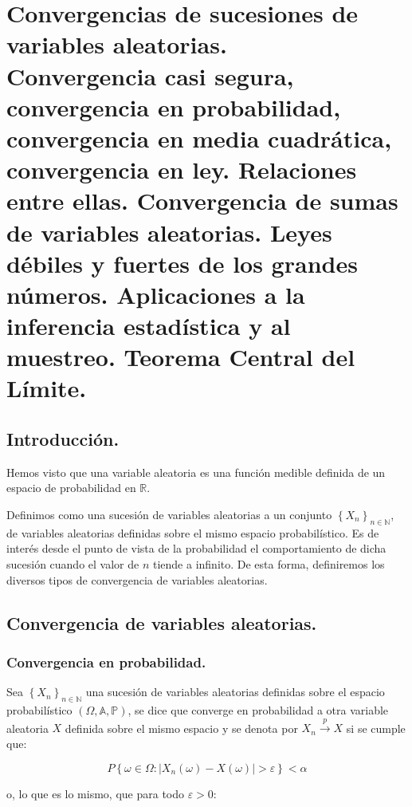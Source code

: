 
\chapter[Convergencias de sucesiones de variables aleatorias.]{Convergencias de sucesiones de variables aleatorias.\\
\normalsize Convergencia casi segura, convergencia en probabilidad, convergencia en media cuadr\'atica, convergencia en ley. Relaciones entre ellas. Convergencia de sumas de variables aleatorias. Leyes d\'ebiles y fuertes de los grandes n\'umeros. Aplicaciones a la inferencia estad\'istica y al muestreo. Teorema Central del L\'imite.}


\section{Introducci\'on.}

Hemos visto que una variable aleatoria es una funci\'on medible definida de un espacio de probabilidad en $\mathbb{R}$.

Definimos como una sucesi\'on de variables aleatorias a un conjunto $\left\{X_n\right\}_{n\in\mathbb{N}}$, de variables aleatorias definidas sobre el mismo espacio probabil\'istico. Es de inter\'es desde el punto de vista de la probabilidad el comportamiento de dicha sucesi\'on cuando el valor de $n$ tiende a infinito. De esta forma, definiremos los diversos tipos de convergencia de variables aleatorias.

\section{Convergencia de variables aleatorias.}
\subsection{Convergencia en probabilidad.}

\begin{definicion}

Sea $ \left\{X_n\right\}_{n\in\mathbb{N}} $ una sucesi\'on de variables aleatorias definidas sobre el espacio probabil\'istico $\left(\Omega,\mathbb{A}, \mathbb{P}\right) $, se dice que converge en probabilidad a otra variable aleatoria $X$ definida sobre el mismo espacio y se denota por $X_{n} \overset{p}{\to} X $ si se cumple que:

\begin{equation}
P\left\{ \omega\in\Omega:\left|X_{n}(\omega)-X(\omega)\right|>\varepsilon\right\} <\alpha
\end{equation}

\end{definicion}
o, lo que es lo mismo, que para todo $\varepsilon > 0$:

